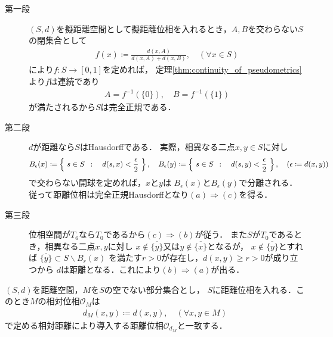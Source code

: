 	\begin{prf}\mbox{}
		\begin{description}
			\item[第一段]
				$(S,d)$を擬距離空間として擬距離位相を入れるとき，$A,B$を交わらない$S$の閉集合として
				\begin{align}
					f(x) \coloneqq \frac{d(x,A)}{d(x,A) + d(x,B)},
					\quad (\forall x \in S)
				\end{align}
				により$f:S \longrightarrow [0,1]$を定めれば，
				定理\ref{thm:continuity_of_pseudometrics}より$f$は連続であり
				\begin{align}
					A = f^{-1}(\{0\}),\quad B = f^{-1}(\{1\})
				\end{align}
				が満たされるから$S$は完全正規である．
				
			\item[第二段] 
				$d$が距離なら$S$はHausdorffである．
				実際，相異なる二点$x,y \in S$に対し
				\begin{align}
					B_\epsilon(x) \coloneqq \left\{\ s \in S\ \, : \quad d(s,x) < \frac{\epsilon}{2}\ \right\},
					\quad B_\epsilon(y) \coloneqq \left\{\ s \in S\ \, : \quad d(s,y) < \frac{\epsilon}{2}\ \right\},
					\quad (\epsilon \coloneqq d(x,y))
				\end{align}
				で交わらない開球を定めれば，$x$と$y$は
				$B_\epsilon(x)$と$B_\epsilon(y)$で分離される．
				従って距離位相は完全正規Hausdorffとなり$(a) \Longrightarrow (c)$を得る．
				
			\item[第三段]
				位相空間が$T_6$なら$T_0$であるから$(c) \Longrightarrow (b)$が従う．
				また$S$が$T_0$であるとき，相異なる二点$x,y$に対し
				$x \notin \overline{\{y\}}$又は$y \notin \overline{\{x\}}$となるが，
				$x \notin \overline{\{y\}}$とすれば
				$\overline{\{y\}} \subset S \backslash B_r(x)$
				を満たす$r > 0$が存在し，$d(x,y) \geq r > 0$が成り立つから
				$d$は距離となる．これにより$(b) \Longrightarrow (a)$が出る．
				\QED
		\end{description}
	\end{prf}
	
	\begin{screen}
		\begin{thm}[距離空間の部分空間の距離]
			$(S,d)$を距離空間，$M$を$S$の空でない部分集合とし，
			$S$に距離位相を入れる．このとき$M$の相対位相$\mathscr{O}_M$は
			\begin{align}
				d_M(x,y) \coloneqq d(x,y),
				\quad (\forall x,y \in M)
			\end{align}
			で定める相対距離により導入する距離位相$\mathscr{O}_{d_M}$と一致する．
		\end{thm}
	\end{screen}
	
